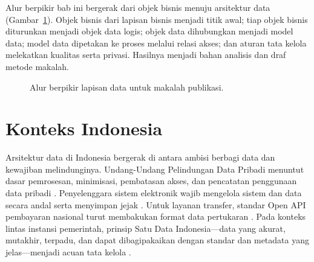 Alur berpikir bab ini bergerak dari objek bisnis menuju arsitektur data
(Gambar~\ref{fig:data-flow}). Objek bisnis dari lapisan bisnis menjadi titik awal;
tiap objek bisnis diturunkan menjadi objek data logis; objek data dihubungkan
menjadi model data; model data dipetakan ke proses melalui relasi akses; dan
aturan tata kelola melekatkan kualitas serta privasi. Hasilnya menjadi bahan
analisis dan draf metode makalah.

\begin{figure}[htbp]
\centering
{}
\caption{Alur berpikir lapisan data untuk makalah publikasi.}
\label{fig:data-flow}
\end{figure}

\section{Konteks Indonesia}

Arsitektur data di Indonesia bergerak di antara ambisi berbagi data dan kewajiban
melindunginya. Undang-Undang Pelindungan Data Pribadi menuntut dasar pemrosesan,
minimisasi, pembatasan akses, dan pencatatan penggunaan data pribadi
\cite{uupdp2022}. Penyelenggara sistem elektronik wajib mengelola sistem dan data
secara andal serta menyimpan jejak \cite{pp712019}. Untuk layanan transfer,
standar Open API pembayaran nasional turut membakukan format data pertukaran
\cite{snapbi}. Pada konteks lintas instansi pemerintah, prinsip Satu Data
Indonesia---data yang akurat, mutakhir, terpadu, dan dapat dibagipakaikan dengan
standar dan metadata yang jelas---menjadi acuan tata kelola \cite{satudata}.


